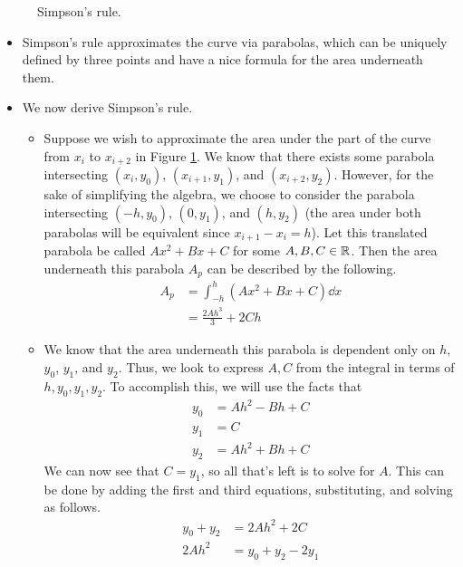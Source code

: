 \documentclass[../main.tex]{subfiles}
\begin{document}
\begin{itemize}
\begin{figure}[h!]
        \caption{Simpson's rule.}
        \label{fig:SimpsonsRule}
    \end{figure}
    \begin{itemize}
        \item Simpson's rule approximates the curve via parabolas, which can be uniquely defined by three points and have a nice formula for the area underneath them.
        \item We now derive Simpson's rule.
        \begin{itemize}
            \item Suppose we wish to approximate the area under the part of the curve from $x_i$ to $x_{i+2}$ in Figure \ref{fig:SimpsonsRule}. We know that there exists some parabola intersecting $(x_i,y_0)$, $(x_{i+1},y_1)$, and $(x_{i+2},y_2)$. However, for the sake of simplifying the algebra, we choose to consider the parabola intersecting $(-h,y_0)$, $(0,y_1)$, and $(h,y_2)$ (the area under both parabolas will be equivalent since $x_{i+1}-x_i=h$). Let this translated parabola be called $Ax^2+Bx+C$ for some $A,B,C\in\mathbb{R}$. Then the area underneath this parabola $A_p$ can be described by the following.
            \begin{align*}
                A_p &= \int_{-h}^h\left( Ax^2+Bx+C \right)\dd{x}\\
                &= \frac{2Ah^3}{3}+2Ch
            \end{align*}
            \item We know that the area underneath this parabola is dependent only on $h$, $y_0$, $y_1$, and $y_2$. Thus, we look to express $A,C$ from the integral in terms of $h,y_0,y_1,y_2$. To accomplish this, we will use the facts that
            \begin{align*}
                y_0 &= Ah^2-Bh+C\\
                y_1 &= C\\
                y_2 &= Ah^2+Bh+C
            \end{align*}
            We can now see that $C=y_1$, so all that's left is to solve for $A$. This can be done by adding the first and third equations, substituting, and solving as follows.
            \begin{align*}
                y_0+y_2 &= 2Ah^2+2C\\
                2Ah^2 &= y_0+y_2-2y_1\\

\end{align*}
\end{itemize}
\end{itemize}
\end{itemize}
\end{document}

